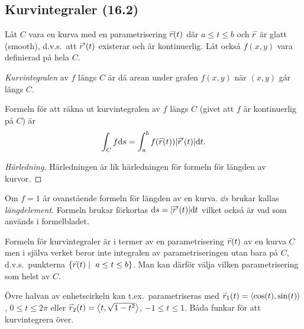 \documentclass[a4paper]{article}
\begin{document}
\providecommand\fname{}
\renewcommand\fname{19-10-04}

\subsection{Kurvintegraler (16.2)}
\begin{defn}[Kurvintegraler]
    Låt \(
        C
    \) vara en kurva med en parametrisering \(
        \accentset{\rightharpoonup}{r} (t)
    \) där \(
        a \leq t \leq b
    \) och \(
        \accentset{\rightharpoonup}{r} 
    \) är glatt (smooth), d.v.s.\ att \(
        \accentset{\rightharpoonup}{r} '(t)
    \) existerar och är kontinuerlig. Låt också \(
        f(x,y)
    \) vara definierad på hela \(
        C
    \).

    \emph{Kurvintegralen} av \(
        f
    \) längs \(
        C
    \) är då arean under grafen \(
        f(x,y)
    \) när \(
        (x,y)
    \) går längs \(
        C
    \).

    Formeln för att räkna ut kurvintegralen av \(
        f
    \) längs \(
        C
    \) (givet att \(
        f
    \) är kontinuerlig på \(
        C
    \)) är \[
        \int_C f \dd s = \int_a^b f(\accentset{\rightharpoonup}{r} (t)) \abs{\accentset{\rightharpoonup}{r} '(t)} \dd t.
    \] 

    \begin{proof}[Härledning]
        Härledningen är lik härledningen för formeln för längden av kurvor.
    \end{proof}
\end{defn}

Om \(
    f = 1
\) är ovanstående formeln för längden av en kurva. \(
    \dd s
\) brukar kallas \emph{längdelement}. Formeln brukar förkortas \(
    \dd s = \abs{\accentset{\rightharpoonup}{r} '(t)} \dd t
\) vilket också är vad som används i formelbladet.

\begin{anm}
    Formeln för kurvintegraler är i termer av en parametrisering \(
        \accentset{\rightharpoonup}{r} (t)
    \) av en kurva \(
        C
    \) men i själva verket beror inte integralen av parametriseringen 
    utan bara på \(
        C
    \), d.v.s.\ punkterna \(
        \{ \ver(t) \; | \; a \leq t \leq b \}
    \). Man kan därför välja vilken parametrisering som helst av \(
        C
    \).
\end{anm}

\begin{ex}
    Övre halvan av enhetscirkeln kan t.ex.\ parametriseras med \(
        \accentset{\rightharpoonup}{r}_1 (t) = \left\langle \cos(t), \sin(t) \right\rangle 
    \), \(
        0 \leq t \leq 2\pi
    \) eller \(
        \accentset{\rightharpoonup}{r}_2 (t) = \left\langle t, \sqrt{1-t^2}\right\rangle 
    \), \(
        -1 \leq t \leq 1
    \). Båda funkar för att kurvintegrera över.
\end{ex}
\end{document}
